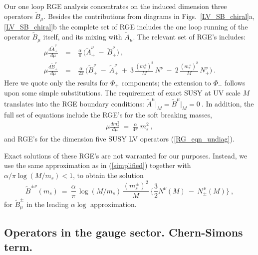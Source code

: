 \documentclass[12pt]{revtex4}
\begin{document}
Our one loop RGE analysis concentrates on the induced dimension three 
operators $ \widetilde{B}_\mu $. Besides the contributions from
diagrams in Figs.~\ref{LV_SB_chiral}a, \ref{LV_SB_chiral}b the 
complete set of RGE includes the one loop running of the operator $
\widetilde{B}_\mu $ itself, and its mixing with $ \widetilde{A}_\mu $.
The relevant set of RGE's includes: 
\begin{eqnarray}
\label{RG_AB}
\nonumber
\mu\frac{d \widetilde{A}_+^\nu}{d\mu} 
& ~=~ &
\frac{\alpha}{\pi} \,  \Big(  \widetilde{A}_+^\nu  
~-~\widetilde{B}_+^\nu \Big)~, 
        \\
\mu\frac{d \widetilde{B}_+^\nu}{d\mu} 
& ~=~ &
\frac{\alpha}{2\pi} \, \Big(
\widetilde{B}_+^\nu  ~-~ \widetilde{A}_+^\nu  
~+~3\, \frac{(m_s^+)^2}{M}\, N^\nu 
~-~2\, \frac{(m_s^+)^2}{M}\, N_+^\nu 
\Big)~.
\end{eqnarray}
%
Here we quote only the results for $\Phi_+$ components; the extension
to $\Phi_-$ follows upon some simple substitutions. The requirement of
exact SUSY at UV scale $M$ translates into the RGE boundary
conditions:
\( 
\widetilde{A}^\mu \Bigr|_M = \widetilde{B}^\mu \Bigr|_M = 0~.
\) 
In addition, the full set of equations include the RGE's for the soft breaking masses, 
%
\begin{eqnarray}
       \mu \frac{d m_s^2}
               {d\mu}            ~ =~ 
        \frac{\alpha}{4\pi}~ m_s^2~,
\end{eqnarray}
%
and RGE's for the dimension five SUSY LV operators
(\ref{RG_eqn_undiag}).   

Exact solutions of these RGE's are not
warranted for our purposes. Instead, we use the same approximation as
in (\ref{simplified}) together with  
$ \alpha/\pi \log (M/m_s) < 1$,
to obtain the solution 
\begin{equation}
\label{B_mu_coef}
\widetilde{B}^{\pm\nu} (m_s) ~=~ \frac{\alpha}{\pi}\, 
\log ( M/m_s )\,
\frac{(m_{s}^\pm)^2 }{M}\, 
\Big\{ 
\frac{3}
     {2} N^\nu(M) 
~-~ N_\pm^{\,\nu}(M)
\Big\}~,
\end{equation}
%
for $\widetilde{B}^\pm_\mu$ in the leading 
$\alpha\log$ approximation.




\subsection{Operators in the gauge sector. Chern-Simons term.}
\label{SB_gauge_sector}
   
\end{document}
